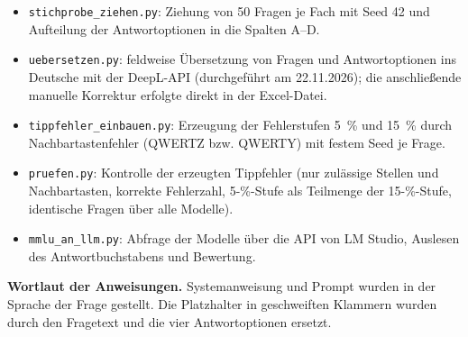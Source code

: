 \documentclass[a4paper,titlepage]{article}
\numberwithin{equation}{section} %
\begin{document}
\begin{itemize}
\item \texttt{stichprobe\_ziehen.py}: Ziehung von 50 Fragen je Fach mit Seed 42 und Aufteilung der Antwortoptionen in die Spalten A--D.
\item \texttt{uebersetzen.py}: feldweise Übersetzung von Fragen und Antwortoptionen ins Deutsche mit der DeepL-API (durchgeführt am 22.11.2026); die anschließende manuelle Korrektur erfolgte direkt in der Excel-Datei.
\item \texttt{tippfehler\_einbauen.py}: Erzeugung der Fehlerstufen 5~\% und 15~\% durch Nachbartastenfehler (QWERTZ bzw. QWERTY) mit festem Seed je Frage.
\item \texttt{pruefen.py}: Kontrolle der erzeugten Tippfehler (nur zulässige Stellen und Nachbartasten, korrekte Fehlerzahl, 5-\%-Stufe als Teilmenge der 15-\%-Stufe, identische Fragen über alle Modelle).
\item \texttt{mmlu\_an\_llm.py}: Abfrage der Modelle über die API von LM Studio, Auslesen des Antwortbuchstabens und Bewertung.
\end{itemize}

\textbf{Wortlaut der Anweisungen.} Systemanweisung und Prompt wurden in der Sprache der Frage gestellt. Die Platzhalter in geschweiften Klammern wurden durch den Fragetext und die vier Antwortoptionen ersetzt.
\end{document}
